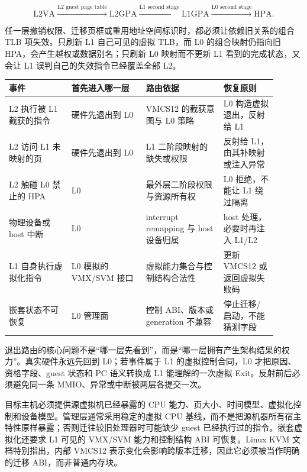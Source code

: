 \[
\mathrm{L2VA}\xrightarrow{\text{L2 guest page table}}\mathrm{L2GPA}
\xrightarrow{\text{L1 second stage}}\mathrm{L1GPA}
\xrightarrow{\text{L0 second stage}}\mathrm{HPA}.
\]

任一层撤销权限、迁移页框或重用地址空间标识时，都必须让依赖旧关系的组合 TLB 项失效。只刷新 L1 自己可见的虚拟 TLB，而 L0 的组合映射仍指向旧 HPA，会产生越权或数据别名；只刷新 L0 映射而不更新 L1 看到的完成状态，又会让 L1 误判自己的失效指令已经覆盖全部 L2。

\begin{longtable}{L{0.21\linewidth}L{0.25\linewidth}L{0.26\linewidth}L{0.18\linewidth}}
\toprule
事件 & 首先进入哪一层 & 路由依据 & 恢复原则 \\
\midrule
L2 执行被 L1 截获的指令 & 硬件先退出到 L0 & VMCS12 的截获意图与 L0 策略 & L0 构造虚拟退出，反射给 L1 \\\tablerowrule
L2 访问 L1 未映射的页 & 硬件先退出到 L0 & L1 二阶段映射的缺失或权限 & 反射给 L1，由其补映射或注入异常 \\\tablerowrule
L2 触碰 L0 禁止的 HPA & L0 & 最外层二阶段权限与资源所有权 & L0 拒绝，不能让 L1 绕过隔离 \\\tablerowrule
物理设备或 host 中断 & L0 & interrupt remapping 与 host 设备归属 & host 处理，必要时再注入 L1/L2 \\\tablerowrule
L1 自身执行虚拟化指令 & L0 模拟的 VMX/SVM 接口 & 虚拟能力集合与控制结构合法性 & 更新 VMCS12 或返回虚拟失败码 \\\tablerowrule
嵌套状态不可恢复 & L0 管理面 & 控制 ABI、版本或 generation 不兼容 & 停止迁移/启动，不能猜测字段 \\
\bottomrule
\end{longtable}

退出路由的核心问题不是“哪一层先看到”，而是“哪一层拥有产生架构结果的权力”。真实硬件永远先回到 L0；若事件属于 L1 的虚拟控制合同，L0 才把原因、资格字段、guest 状态和 PC 语义转换成 L1 能理解的一次虚拟 Exit。反射前后必须避免同一条 MMIO、异常或中断被两层各提交一次。


目标主机必须提供源虚拟机已经暴露的 CPU 能力、页大小、时间模型、虚拟化控制和设备模型。管理层通常采用稳定的虚拟 CPU 基线，而不是把源机器所有宿主特性原样暴露；否则迁往较旧处理器时可能缺少 guest 已经执行过的指令。嵌套虚拟化还要求 L1 可见的 VMX/SVM 能力和控制结构 ABI 可恢复。Linux KVM 文档特别指出，内部 VMCS12 表示变化会影响跨版本迁移，因此它必须被当作明确的迁移 ABI，而非普通内存块。\cite{linux-nested-vmx}

